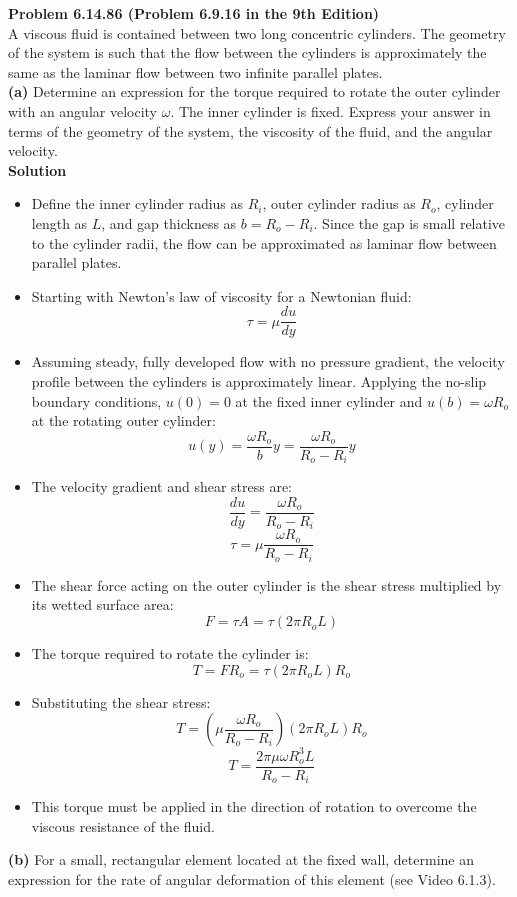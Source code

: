 ﻿\documentclass[12pt]{article}
\begin{document}
\textbf{Problem 6.14.86 (Problem 6.9.16 in the 9th Edition)}\\
A viscous fluid is contained between two long concentric cylinders. The geometry of the system is such that the flow between the cylinders is approximately the same as the laminar flow between two infinite parallel plates.\\
\textbf{(a)} Determine an expression for the torque required to rotate the outer cylinder with an angular velocity $\omega$. The inner cylinder is fixed. Express your answer in terms of the geometry of the system, the viscosity of the fluid, and the angular velocity.\\
\textbf{Solution}
\begin{itemize}
    \item Define the inner cylinder radius as $R_i$, outer cylinder radius as $R_o$, cylinder length as $L$, and gap thickness as $b=R_o-R_i$. Since the gap is small relative to the cylinder radii, the flow can be approximated as laminar flow between parallel plates.
    \item Starting with Newton's law of viscosity for a Newtonian fluid:
    \[\tau=\mu\frac{du}{dy}\]
    \item Assuming steady, fully developed flow with no pressure gradient, the velocity profile between the cylinders is approximately linear. Applying the no-slip boundary conditions, $u(0)=0$ at the fixed inner cylinder and $u(b)=\omega R_o$ at the rotating outer cylinder:
    \[u(y)=\frac{\omega R_o}{b}y=\frac{\omega R_o}{R_o-R_i}y\]
    \item The velocity gradient and shear stress are:
    \[\frac{du}{dy}=\frac{\omega R_o}{R_o-R_i}\]
    \[\tau=\mu\frac{\omega R_o}{R_o-R_i}\]
    \item The shear force acting on the outer cylinder is the shear stress multiplied by its wetted surface area:
    \[F=\tau A=\tau(2\pi R_oL)\]
    \item The torque required to rotate the cylinder is:
    \[T=FR_o=\tau(2\pi R_oL)R_o\]
    \item Substituting the shear stress:
    \[T=\left(\mu\frac{\omega R_o}{R_o-R_i}\right)(2\pi R_oL)R_o\]
    \[\boxed{T=\frac{2\pi\mu\omega R_o^3L}{R_o-R_i}}\]
    \item This torque must be applied in the direction of rotation to overcome the viscous resistance of the fluid.
\end{itemize}
\textbf{(b)} For a small, rectangular element located at the fixed wall, determine an expression for the rate of angular deformation of this element (see Video 6.1.3).\\
\end{document}

